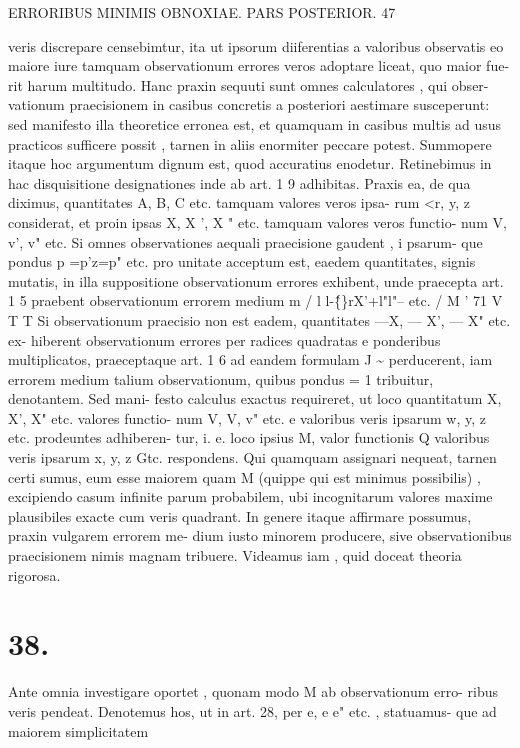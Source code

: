\documentclass[12pt,a4paper]{article}
\begin{document}
\newpage
\begin{center}
\textsc{ERRORIBUS MINIMIS OBNOXIAE. PARS POSTERIOR. 47}
\end{center}
veris discrepare censebimtur, ita ut ipsorum diiferentias a valoribus observatis eo
maiore iure tamquam observationum errores veros adoptare liceat, quo maior fue-
rit harum multitudo. Hanc praxin sequuti sunt omnes calculatores , qui obser-
vationum praecisionem in casibus concretis a posteriori aestimare susceperunt: sed
manifesto illa theoretice erronea est, et quamquam in casibus multis ad usus
practicos sufficere possit , tarnen in aliis enormiter peccare potest. Summopere
itaque hoc argumentum dignum est, quod accuratius enodetur.
Retinebimus in hac disquisitione designationes inde ab art. 1 9 adhibitas.
Praxis ea, de qua diximus, quantitates A, B, C etc. tamquam valores veros ipsa-
rum <r, y, z considerat, et proin ipsas X, X ', X " etc. tamquam valores veros functio-
num V, v', v" etc. Si omnes observationes aequali praecisione gaudent , i psarum-
que pondus p =p'z=p" etc. pro unitate acceptum est, eaedem quantitates, signis
mutatis, in illa suppositione observationum errores exhibent, unde praecepta
art. 1 5 praebent observationum errorem medium m
/ l l-\^\{\}rX'+l"l"-- etc. / M
' 71 V T T
Si observationum praecisio non est eadem, quantitates ---X, --- X', --- X" etc. ex-
hiberent observationum errores per radices quadratas e ponderibus multiplicatos,
praeceptaque art. 1 6 ad eandem formulam J \~{} perducerent, iam errorem medium
talium observationum, quibus pondus = 1 tribuitur, denotantem. Sed mani-
festo calculus exactus requireret, ut loco quantitatum X, X', X" etc. valores functio-
num V, V, v" etc. e valoribus veris ipsarum w, y, z etc. prodeuntes adhiberen-
tur, i. e. loco ipsius M, valor functionis Q valoribus veris ipsarum x, y, z Gtc.
respondens. Qui quamquam assignari nequeat, tarnen certi sumus, eum esse
maiorem quam M (quippe qui est minimus possibilis) , excipiendo casum infinite
parum probabilem, ubi incognitarum valores maxime plausibiles exacte cum veris
quadrant. In genere itaque affirmare possumus, praxin vulgarem errorem me-
dium iusto minorem producere, sive observationibus praecisionem nimis magnam
tribuere. Videamus iam , quid doceat theoria rigorosa.
\section*{\textbf{38.}}
Ante omnia investigare oportet , quonam modo M ab observationum erro-
ribus veris pendeat. Denotemus hos, ut in art. 28, per e, e e" etc. , statuamus-
que ad maiorem simplicitatem
\end{document}
